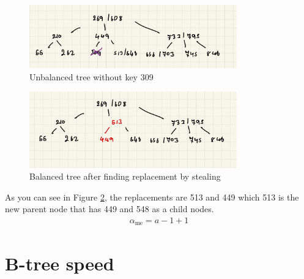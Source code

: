 \documentclass[a4paper, 12pt]{report}
\begin{document}
\begin{figure}[h]
        \centering
        \includegraphics[width=0.8\textwidth,scale=0.5]{tree_deletion_1.jpeg}
        \caption{\label{fig:tree-deletion-1} Unbalanced tree without key 309}
\end{figure}

\begin{figure}[h]
        \centering
        \includegraphics[width=0.8\textwidth,scale=0.5]{tree_deletion_2.jpeg}
        \caption{\label{fig:tree-deletion-2} Balanced tree after finding replacement by stealing}
\end{figure}

As you can see in Figure \ref{fig:tree-deletion-2}, the replacements are 513 and 449 which 513 is the new parent node
that has 449 and 548 as a child nodes. 
\begin{align*}
        \alpha_{\text{me}} = a - 1 + 1
\end{align*} 


\chapter{B-tree speed}
\end{document}

